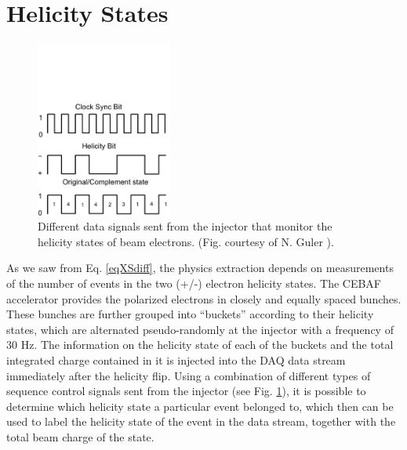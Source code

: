 \section{Helicity States}

\begin{figure}[H]%
  \centering
  \leavevmode \includegraphics[width=0.4\textwidth]{figuresEG4/FigSim/helicityPairingNevzatCut} 
  \caption[Helicity Pairing]{Different data signals sent from the injector that monitor the helicity states of beam electrons. (Fig. courtesy of N. Guler \cite{nGuler_th} ).}
  \label{figHeli}
\end{figure}

As we saw from Eq. \ref{eqXSdiff}, the physics %
extraction depends on %
measurements of the number of events in %
the two (+/-) electron helicity states. The CEBAF accelerator provides the polarized electrons in closely and %
equally spaced bunches. These bunches are further grouped into ``buckets'' according to their helicity states, which are %
alternated pseudo-randomly at the injector with a frequency of 30 Hz. The information on the helicity state of each of the buckets and the total integrated charge contained in it is injected into the DAQ data stream immediately after the helicity flip. Using a combination of different types of sequence control signals sent from the injector (see Fig. \ref{figHeli}), it is possible to determine which helicity state a particular event belonged to, which then can be used to label the helicity state of the event in the data stream, %
together with the total beam charge of the state.


